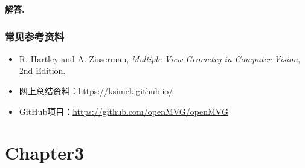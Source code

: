 \documentclass[12pt, a4paper, oneside]{ctexart}
\numberwithin{equation}{section}  %
\newenvironment{solution}[1][]{\par\noindent\textbf{#1解答. }}{\smallskip\par}  %
\begin{document}
\begin{solution}
\subsubsection*{常见参考资料}
\begin{itemize}
  \item R. Hartley and A. Zisserman, \textit{Multiple View Geometry in Computer Vision}, 2nd Edition.
  \item 网上总结资料：\url{https://ksimek.github.io/}
  \item GitHub项目：\url{https://github.com/openMVG/openMVG}
\end{itemize}
\end{solution}

\section{Chapter3}
\end{document}
